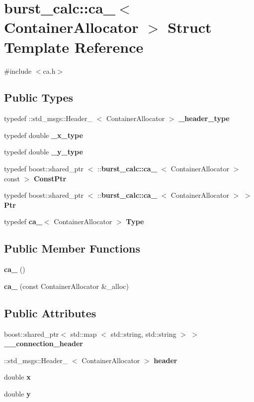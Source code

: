\section{burst\-\_\-calc\-:\-:ca\-\_\-$<$ \-Container\-Allocator $>$ \-Struct \-Template \-Reference}
\label{structburst__calc_1_1ca__}


{\ttfamily \#include $<$ca.\-h$>$}

\subsection*{\-Public \-Types}
\begin{DoxyCompactItemize}
\item 
typedef \-::std\-\_\-msgs\-::\-Header\-\_\-\*
$<$ \-Container\-Allocator $>$ {\bf \-\_\-header\-\_\-type}
\item 
typedef double {\bf \-\_\-x\-\_\-type}
\item 
typedef double {\bf \-\_\-y\-\_\-type}
\item 
typedef boost\-::shared\-\_\-ptr\*
$<$ \-::{\bf burst\-\_\-calc\-::ca\-\_\-}\*
$<$ \-Container\-Allocator $>$ const  $>$ {\bf \-Const\-Ptr}
\item 
typedef boost\-::shared\-\_\-ptr\*
$<$ \-::{\bf burst\-\_\-calc\-::ca\-\_\-}\*
$<$ \-Container\-Allocator $>$ $>$ {\bf \-Ptr}
\item 
typedef {\bf ca\-\_\-}$<$ \-Container\-Allocator $>$ {\bf \-Type}
\end{DoxyCompactItemize}
\subsection*{\-Public \-Member \-Functions}
\begin{DoxyCompactItemize}
\item 
{\bf ca\-\_\-} ()
\item 
{\bf ca\-\_\-} (const \-Container\-Allocator \&\-\_\-alloc)
\end{DoxyCompactItemize}
\subsection*{\-Public \-Attributes}
\begin{DoxyCompactItemize}
\item 
boost\-::shared\-\_\-ptr$<$ std\-::map\*
$<$ std\-::string, std\-::string $>$ $>$ {\bf \-\_\-\-\_\-connection\-\_\-header}
\item 
\-::std\-\_\-msgs\-::\-Header\-\_\-\*
$<$ \-Container\-Allocator $>$ {\bf header}
\item 
double {\bf x}
\item 
double {\bf y}
\end{DoxyCompactItemize}


